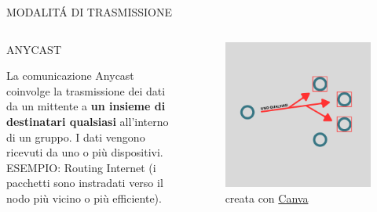 \documentclass[aspectratio=1610]{beamer}
\begin{document}
\begin{frame}{MODALIT\'A DI TRASMISSIONE}
    \begin{columns}
        \begin{alertblock}{ANYCAST}
            \begin{minipage}{0.96\linewidth}
                \justifying
                La comunicazione Anycast coinvolge la trasmissione dei dati da un mittente a \textbf{un 
                insieme di destinatari qualsiasi} all'interno di un gruppo. I dati vengono ricevuti da uno o più dispositivi.\\
                ESEMPIO: Routing Internet (i pacchetti sono instradati verso il nodo più vicino o più efficiente).                
            \end{minipage}
        \end{alertblock}
           \begin{figure}
               \includegraphics[width=\linewidth]{img/anycast.png}
               \caption{{creata con \href{https://www.canva.com}{Canva}}}
           \end{figure}
    \end{columns}
\end{frame}
\end{document}
